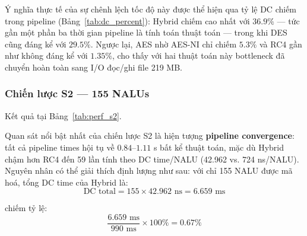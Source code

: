 Ý nghĩa thực tế của sự chênh lệch tốc độ này được thể hiện qua tỷ lệ DC chiếm trong pipeline (Bảng~\ref{tab:dc_percent}): Hybrid chiếm cao nhất với $36.9\%$ --- tức gần một phần ba thời gian pipeline là tính toán thuật toán --- trong khi DES cũng đáng kể với $29.5\%$. Ngược lại, AES nhờ AES-NI chỉ chiếm $5.3\%$ và RC4 gần như không đáng kể với $1.35\%$, cho thấy với hai thuật toán này bottleneck đã chuyển hoàn toàn sang I/O đọc/ghi file 219 MB.

\subsubsection{Chiến lược S2 --- 155 NALUs}

Kết quả tại Bảng~\ref{tab:perf_s2}.

Quan sát nổi bật nhất của chiến lược S2 là hiện tượng \textbf{pipeline convergence}: tất cả pipeline times hội tụ về $0.84$--$1.11$ s bất kể thuật toán, mặc dù Hybrid chậm hơn RC4 đến 59 lần tính theo DC time/NALU (42.962 vs. 724 ns/NALU). Nguyên nhân có thể giải thích định lượng như sau: với chỉ 155 NALU được mã hoá, tổng DC time của Hybrid là:
\begin{equation}
\text{DC total} = 155 \times 42.962 \text{ ns} = 6.659 \text{ ms}
\end{equation}

chiếm tỷ lệ:
\begin{equation}
\frac{6.659 \text{ ms}}{990 \text{ ms}} \times 100\% = 0.67\%
\end{equation}

